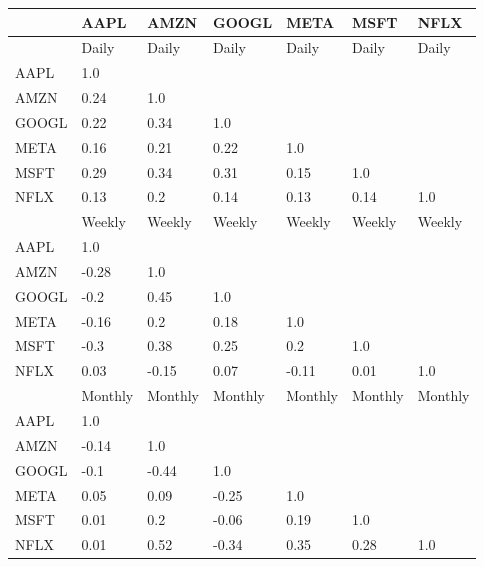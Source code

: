\begin{tabular}{lllllll}
\toprule
{} &     AAPL &     AMZN &    GOOGL &     META &     MSFT &     NFLX \\
\midrule
      &    Daily &    Daily &    Daily &    Daily &    Daily &    Daily \\
AAPL  &      1.0 &          &          &          &          &          \\
AMZN  &     0.24 &      1.0 &          &          &          &          \\
GOOGL &     0.22 &     0.34 &      1.0 &          &          &          \\
META  &     0.16 &     0.21 &     0.22 &      1.0 &          &          \\
MSFT  &     0.29 &     0.34 &     0.31 &     0.15 &      1.0 &          \\
NFLX  &     0.13 &      0.2 &     0.14 &     0.13 &     0.14 &      1.0 \\
      &   Weekly &   Weekly &   Weekly &   Weekly &   Weekly &   Weekly \\
AAPL  &      1.0 &          &          &          &          &          \\
AMZN  &    -0.28 &      1.0 &          &          &          &          \\
GOOGL &     -0.2 &     0.45 &      1.0 &          &          &          \\
META  &    -0.16 &      0.2 &     0.18 &      1.0 &          &          \\
MSFT  &     -0.3 &     0.38 &     0.25 &      0.2 &      1.0 &          \\
NFLX  &     0.03 &    -0.15 &     0.07 &    -0.11 &     0.01 &      1.0 \\
      &  Monthly &  Monthly &  Monthly &  Monthly &  Monthly &  Monthly \\
AAPL  &      1.0 &          &          &          &          &          \\
AMZN  &    -0.14 &      1.0 &          &          &          &          \\
GOOGL &     -0.1 &    -0.44 &      1.0 &          &          &          \\
META  &     0.05 &     0.09 &    -0.25 &      1.0 &          &          \\
MSFT  &     0.01 &      0.2 &    -0.06 &     0.19 &      1.0 &          \\
NFLX  &     0.01 &     0.52 &    -0.34 &     0.35 &     0.28 &      1.0 \\
\bottomrule
\end{tabular}
